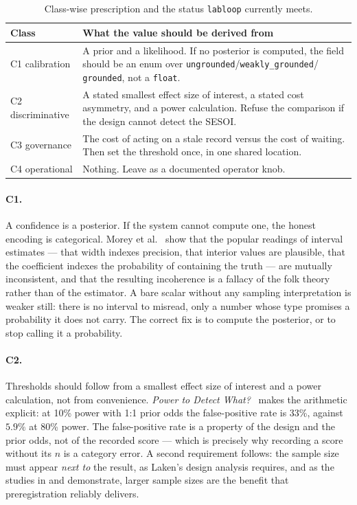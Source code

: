 \documentclass[10pt,twocolumn,letterpaper]{article}
\newcommand{\code}[1]{\texttt{#1}}
\begin{document}
\begin{table}[t]
\centering
\caption{Class-wise prescription and the status \code{labloop} currently meets.}
\label{tab:prescription}
\small
\begin{tabular}{p{}p{}}
\toprule
\textbf{Class} & \textbf{What the value should be derived from} \\
\midrule
C1 calibration & A prior and a likelihood. If no posterior is computed, the
field should be an enum over \code{ungrounded}/\code{weakly\_grounded}/
\code{grounded}, not a \code{float}. \\
C2 discriminative & A stated smallest effect size of interest, a stated
cost asymmetry, and a power calculation. Refuse the comparison if the
design cannot detect the SESOI. \\
C3 governance & The cost of acting on a stale record versus the cost of
waiting. Then set the threshold once, in one shared location. \\
C4 operational & Nothing. Leave as a documented operator knob. \\
\bottomrule
\end{tabular}
\end{table}

\paragraph{C1.} A confidence is a posterior. If the system cannot compute one, the honest
encoding is categorical. Morey et al.~\cite{morey2016} show that the popular readings of interval
estimates --- that width indexes precision, that interior values are plausible, that the
coefficient indexes the probability of containing the truth --- are mutually inconsistent, and that
the resulting incoherence is a fallacy of the folk theory rather than of the estimator. A bare
scalar without any sampling interpretation is weaker still: there is no interval to misread, only
a number whose type promises a probability it does not carry. The correct fix is to compute the
posterior, or to stop calling it a probability.

\paragraph{C2.} Thresholds should follow from a smallest effect size of interest and a power
calculation, not from convenience. \emph{Power to Detect What?}~\cite{power2024} makes the
arithmetic explicit: at 10\% power with 1:1 prior odds the false-positive rate is 33\%, against
$5.9\%$ at 80\% power. The false-positive rate is a property of the design and the prior odds, not
of the recorded score --- which is precisely why recording a score without its $n$ is a category
error. A second requirement follows: the sample size must appear \emph{next to} the result, as
Laken's design analysis requires, and as the studies in \cite{akker2023} and \cite{bakker2020}
demonstrate, larger sample sizes are the benefit that preregistration reliably delivers.
\end{document}
